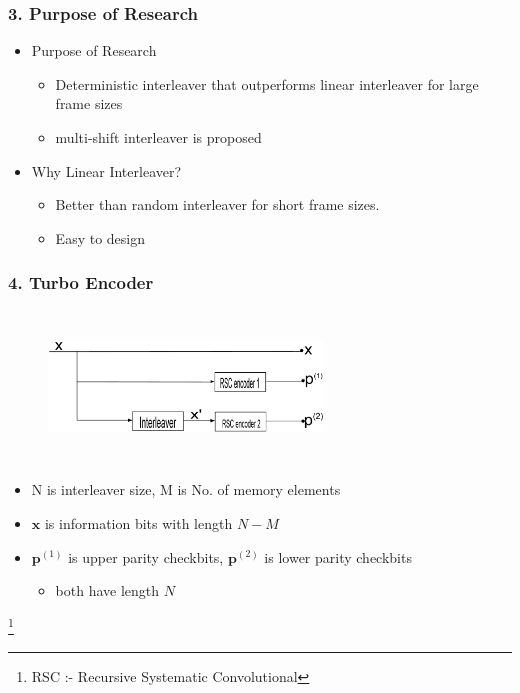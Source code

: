 \documentclass{beamer}  %
\newcommand\blfootnote[1]{%
  \begingroup
  \renewcommand\thefootnote{}\footnote{#1}%
  \addtocounter{footnote}{-1}%
  \endgroup
}
\begin{document}
\begin{frame}
\frametitle{3. Purpose of Research}
\begin{itemize}
\setlength\itemsep{2em}


\item Purpose of Research

\begin{itemize}
\item Deterministic interleaver that outperforms linear interleaver for large frame sizes

\item multi-shift interleaver is proposed
\end{itemize}

\item Why Linear Interleaver?

\begin{itemize}
\item Better than random interleaver for short frame sizes.

\item Easy to design
\end{itemize}

\end{itemize}
\end{frame}

\begin{frame}
\frametitle{4. Turbo Encoder}

\begin{figure}
\centering
		\includegraphics[height = 4cm, width=0.65\textwidth]{TurboEncoder.eps}
	\end{figure}


\begin{itemize}
\item N is interleaver size, M is No. of memory elements
\item $\mathbf{x}$ is information bits with length $N-M$
\item $\mathbf{p}^{(1)}$ is upper parity checkbits, $\mathbf{p}^{(2)}$ is lower parity checkbits 

\begin{itemize}
\item both have length $N$
\end{itemize}

\end{itemize}
\blfootnote {RSC :- Recursive Systematic Convolutional}
\end{frame}
\end{document}
